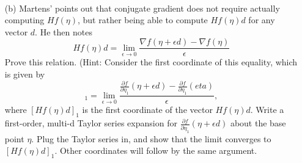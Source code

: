 \documentclass[]{article}
\begin{document}
~

\begin{itemize} \item[(b)] 
Martens' points out that conjugate gradient does not require actually computing $Hf(\eta)$, but rather being able to compute $Hf(\eta)d$ for any vector $d$.   He then notes
\begin{equation*}
Hf(\eta)d = \lim_{\epsilon \to 0} \frac{\nabla f(\eta + \epsilon d) - \nabla f(\eta)}{\epsilon}
\end{equation*}
Prove this relation.  (Hint:  Consider the first coordinate of this equality, which is given by
\begin{equation*}
[Hf(\eta)d]_1= \lim_{\epsilon \to 0} \frac{\frac{\partial f}{\partial \eta_1}(\eta + \epsilon d) -  \frac{\partial f}{\partial \eta_1}(eta)}{\epsilon},
\end{equation*}
where $[Hf(\eta)d]_1$ is the first coordinate of the vector $Hf(\eta)d$.  Write a first-order, multi-d Taylor series expansion for  $\frac{\partial f}{\partial \eta_1}(\eta + \epsilon d)$ about the base point $\eta$.  Plug the Taylor series in, and show that the limit converges to $[Hf(\eta)d]_1$.   Other coordinates will follow by the same argument.
\end{itemize}

~
\end{document}
